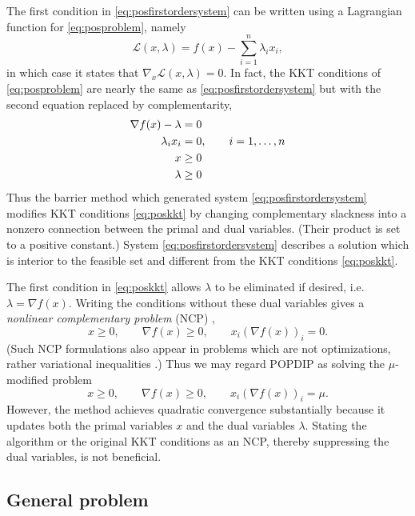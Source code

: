\documentclass[11pt]{article}
\newcommand{\grad}{\nabla}
\begin{document}
The first condition in \eqref{eq:posfirstordersystem} can be written using a Lagrangian function for \eqref{eq:posproblem}, namely
\begin{equation}
\mathcal{L}(x,\lambda) = f(x) - \sum_{i=1}^n \lambda_i x_i,  \label{eq:poslagrangian}
\end{equation}
in which case it states that $\grad_x \mathcal{L}(x,\lambda)=0$.  In fact, the KKT conditions \cite[sections 14.4, 14.5]{GrivaNashSofer2009} of \eqref{eq:posproblem} are nearly the same as \eqref{eq:posfirstordersystem} but with the second equation replaced by complementarity,
\begin{align}
\grad f(x) - \lambda &= 0 \label{eq:poskkt} \\
\lambda_i x_i &= 0, \qquad i=1,\dots,n \notag \\
x &\ge 0 \notag \\
\lambda &\ge 0 \notag
\end{align}
Thus the barrier method which generated system \eqref{eq:posfirstordersystem} modifies KKT conditions \eqref{eq:poskkt} by changing complementary slackness into a nonzero connection between the primal and dual variables.  (Their product is set to a positive constant.)  System \eqref{eq:posfirstordersystem} describes a solution which is interior to the feasible set and different from the KKT conditions \eqref{eq:poskkt}.

The first condition in \eqref{eq:poskkt} allows $\lambda$ to be eliminated if desired, i.e.~$\lambda = \grad f(x)$.  Writing the conditions without these dual variables gives a \emph{nonlinear complementary problem} (NCP) \cite{FacchineiPang2007},
\begin{equation}
x \ge 0, \qquad \grad f(x) \ge 0, \qquad x_i (\grad f(x))_i = 0.  \label{eq:posncp}
\end{equation}
(Such NCP formulations also appear in problems which are not optimizations, rather variational inequalities \cite{BensonMunson2006,Bueler2016}.)  Thus we may regard POPDIP as solving the $\mu$-modified problem
    $$x \ge 0, \qquad \grad f(x) \ge 0, \qquad x_i (\grad f(x))_i = \mu.$$
However, the method achieves quadratic convergence substantially because it updates both the primal variables $x$ and the dual variables $\lambda$.  Stating the algorithm or the original KKT conditions as an NCP, thereby suppressing the dual variables, is not beneficial.


\subsection*{General problem}
\end{document}

